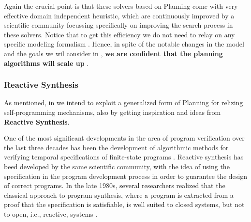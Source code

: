 Again the crucial point is that these solvers based on Planning come with very effective domain independent heuristic, which are continuously improved by a scientific community focussing specifically on improving the search process in these solvers. Notice that to get this efficiency we do not need to relay on any specific modeling formalism \cite{FRLG17}.  Hence, in spite of the notable changes in the model and the goals we wil consider in \project, \textbf{we are confident that the planning algorithms will scale up} .





\subsubsection{Reactive Synthesis}

As mentioned, in \project we intend to exploit a generalized form of Planning for relizing self-programming mechanisms, also by getting inspiration and ideas from \textbf{Reactive Synthesis}.

One of the most significant developments in the area of program
verification over the last three decades has been the development of
algorithmic methods for verifying temporal specifications of
finite-state programs \cite{ClarkeGP:99-ModelChecking,BaKG08}. 
Reactive synthesis has beed developed by the same scientific
community, with the idea of using the specification in the program
development process in order to guarantee the design of correct
programs.  In the late 1980s, several researchers realized that the
classical approach to program synthesis, where a program is extracted
from a proof that the specification is satisfiable, is well suited to
closed systems, but not to open, i.e., reactive, systems
\cite{Abadi:1989ur,PnRo89,Vard96}.
 
